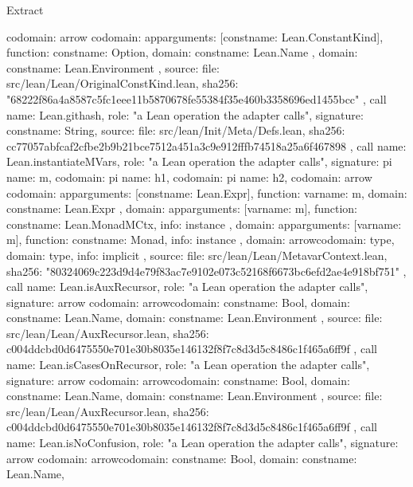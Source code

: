 \begin{lexlean}{Extract}
\begin{toolingmodule}
{{{        codomain: arrow{
          codomain: app{arguments: [const{name: Lean.ConstantKind}], function: const{name: Option}},
          domain: const{name: Lean.Name}
        },
        domain: const{name: Lean.Environment}
      },
      source: {
        file: src/lean/Lean/OriginalConstKind.lean,
        sha256: "68222f86a4a8587c5fc1eee11b5870678fe55384f35e460b3358696ed1455bcc"
      }
    },
    call{
      name: Lean.githash,
      role: "a Lean operation the adapter calls",
      signature: const{name: String},
      source: {
        file: src/lean/Init/Meta/Defs.lean,
        sha256: cc77057abfcaf2cfbe2b9b21bce7512a451a3c9e912fffb74518a25a6f467898
      }
    },
    call{
      name: Lean.instantiateMVars,
      role: "a Lean operation the adapter calls",
      signature: pi{
        name: m,
        codomain: pi{
          name: h1,
          codomain: pi{
            name: h2,
            codomain: arrow{
              codomain: app{arguments: [const{name: Lean.Expr}], function: var{name: m}},
              domain: const{name: Lean.Expr}
            },
            domain: app{arguments: [var{name: m}], function: const{name: Lean.MonadMCtx}},
            info: instance
          },
          domain: app{arguments: [var{name: m}], function: const{name: Monad}},
          info: instance
        },
        domain: arrow{codomain: type{}, domain: type{}},
        info: implicit
      },
      source: {
        file: src/lean/Lean/MetavarContext.lean,
        sha256: "80324069c223d9d4e79f83ac7e9102e073c52168f6673bc6efd2ae4e918bf751"
      }
    },
    call{
      name: Lean.isAuxRecursor,
      role: "a Lean operation the adapter calls",
      signature: arrow{
        codomain: arrow{codomain: const{name: Bool}, domain: const{name: Lean.Name}},
        domain: const{name: Lean.Environment}
      },
      source: {
        file: src/lean/Lean/AuxRecursor.lean,
        sha256: c004ddcbd0d6475550e701e30b8035e146132f8f7c8d3d5c8486c1f465a6ff9f
      }
    },
    call{
      name: Lean.isCasesOnRecursor,
      role: "a Lean operation the adapter calls",
      signature: arrow{
        codomain: arrow{codomain: const{name: Bool}, domain: const{name: Lean.Name}},
        domain: const{name: Lean.Environment}
      },
      source: {
        file: src/lean/Lean/AuxRecursor.lean,
        sha256: c004ddcbd0d6475550e701e30b8035e146132f8f7c8d3d5c8486c1f465a6ff9f
      }
    },
    call{
      name: Lean.isNoConfusion,
      role: "a Lean operation the adapter calls",
      signature: arrow{
        codomain: arrow{codomain: const{name: Bool}, domain: const{name: Lean.Name}},
}}}
\end{toolingmodule}
\end{lexlean}
